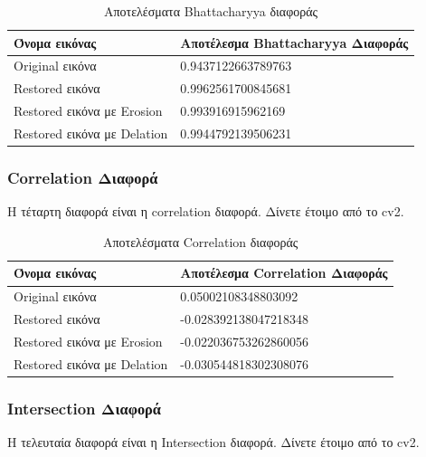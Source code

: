 \begin{table}[H]
  \centering
	\begin{tabular}{ | p{8cm} | p{8cm} | }
		\hline
		\textbf{Όνομα εικόνας} & \textbf{Αποτέλεσμα Bhattacharyya Διαφοράς} \\
    \hline
    Original εικόνα & 0.9437122663789763 \\
    \hline
    Restored εικόνα & 0.9962561700845681 \\
    \hline
    Restored εικόνα με Erosion & 0.993916915962169 \\
    \hline
    Restored εικόνα με Delation & 0.9944792139506231 \\
    \hline
	\end{tabular}
  \caption{Αποτελέσματα Bhattacharyya διαφοράς}
  \label{tab:bhattacharyya}
\end{table}

\subsubsection{Correlation Διαφορά}

Η τέταρτη διαφορά είναι η correlation διαφορά. Δίνετε έτοιμο από το cv2.

\begin{table}[H]
  \centering
	\begin{tabular}{ | p{8cm} | p{8cm} | }
		\hline
		\textbf{Όνομα εικόνας} & \textbf{Αποτέλεσμα Correlation Διαφοράς} \\
    \hline
    Original εικόνα & 0.05002108348803092 \\
    \hline
    Restored εικόνα & -0.028392138047218348 \\
    \hline
    Restored εικόνα με Erosion & -0.022036753262860056 \\
    \hline
    Restored εικόνα με Delation & -0.030544818302308076 \\
    \hline
	\end{tabular}
  \caption{Αποτελέσματα Correlation διαφοράς}
  \label{tab:correlation}
\end{table}

\subsubsection{Intersection Διαφορά}

Η τελευταία διαφορά είναι η Intersection διαφορά. Δίνετε έτοιμο από το cv2.

